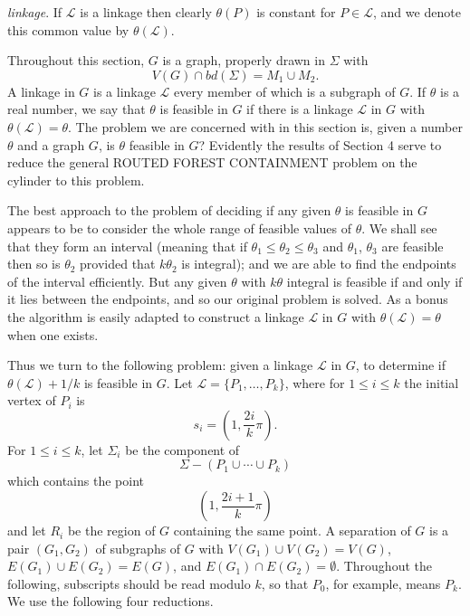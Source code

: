 \noindent \textit{linkage}. If $\mathcal{L}$ is a linkage then clearly $\theta(P)$ is constant for $P \in \mathcal{L}$, and we denote this common value by $\theta(\mathcal{L})$.

Throughout this section, $G$ is a graph, properly drawn in $\Sigma$ with
\begin{equation*}
V(G) \cap bd(\Sigma) = M_1 \cup M_2.
\end{equation*}
A linkage in $G$ is a linkage $\mathcal{L}$ every member of which is a subgraph of $G$. If $\theta$ is a real number, we say that $\theta$ is feasible in $G$ if there is a linkage $\mathcal{L}$ in $G$ with $\theta(\mathcal{L}) = \theta$. The problem we are concerned with in this section is, given a number $\theta$ and a graph $G$, is $\theta$ feasible in $G$? Evidently the results of Section 4 serve to reduce the general ROUTED FOREST CONTAINMENT problem on the cylinder to this problem.

The best approach to the problem of deciding if any given $\theta$ is feasible in $G$ appears to be to consider the whole range of feasible values of $\theta$. We shall see that they form an interval (meaning that if $\theta_1 \le \theta_2 \le \theta_3$ and $\theta_1$, $\theta_3$ are feasible then so is $\theta_2$ provided that $k\theta_2$ is integral); and we are able to find the endpoints of the interval efficiently. But any given $\theta$ with $k\theta$ integral is feasible if and only if it lies between the endpoints, and so our original problem is solved. As a bonus the algorithm is easily adapted to construct a linkage $\mathcal{L}$ in $G$ with $\theta(\mathcal{L}) = \theta$ when one exists.

Thus we turn to the following problem: given a linkage $\mathcal{L}$ in $G$, to determine if $\theta(\mathcal{L}) + 1/k$ is feasible in $G$. Let $\mathcal{L} = \{P_1, \dots, P_k\}$, where for $1 \le i \le k$ the initial vertex of $P_i$ is
\begin{equation*}
s_i = \left(1, \frac{2i}{k}\pi\right).
\end{equation*}
For $1 \le i \le k$, let $\Sigma_i$ be the component of
\begin{equation*}
\Sigma - (P_1 \cup \cdots \cup P_k)
\end{equation*}
which contains the point
\begin{equation*}
\left(1, \frac{2i+1}{k}\pi\right)
\end{equation*}
and let $R_i$ be the region of $G$ containing the same point. A separation of $G$ is a pair $(G_1, G_2)$ of subgraphs of $G$ with $V(G_1) \cup V(G_2) = V(G)$, $E(G_1) \cup E(G_2) = E(G)$, and $E(G_1) \cap E(G_2) = \emptyset$. Throughout the following, subscripts should be read modulo $k$, so that $P_0$, for example, means $P_k$. We use the following four reductions.

